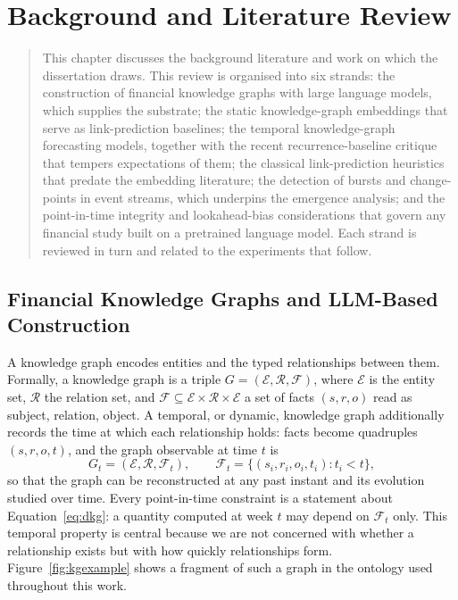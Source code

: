 \documentclass[a4paper,12pt]{report}
\newenvironment{microabstract}{\begin{quotation}\noindent}{\end{quotation}}
\begin{document}
\chapter{Background and Literature Review}
\label{ch:background}
\begin{microabstract}
This chapter discusses the background literature and work on which the dissertation draws. This review is
organised into six strands: the construction of financial knowledge graphs
with large language models, which supplies the substrate; the static
knowledge-graph embeddings that serve as link-prediction baselines; the temporal
knowledge-graph forecasting models, together with the recent recurrence-baseline
critique that tempers expectations of them; the classical link-prediction
heuristics that predate the embedding literature; the detection of bursts and
change-points in event streams, which underpins the emergence analysis; and the
point-in-time integrity and lookahead-bias considerations that govern any
financial study built on a pretrained language model. Each strand is reviewed in
turn and related to the experiments that follow.
\end{microabstract}

\section{Financial Knowledge Graphs and LLM-Based Construction}
A knowledge graph encodes entities and the typed relationships between them.
Formally, a knowledge graph is a triple $G = (\mathcal{E}, \mathcal{R},
\mathcal{F})$, where $\mathcal{E}$ is the entity set, $\mathcal{R}$ the
relation set, and $\mathcal{F} \subseteq \mathcal{E} \times \mathcal{R}
\times \mathcal{E}$ a set of facts $(s, r, o)$ read as subject, relation,
object. A temporal, or dynamic, knowledge graph additionally records the
time at which each relationship holds: facts become quadruples
$(s, r, o, t)$, and the graph observable at time $t$ is
\begin{equation}
G_t = (\mathcal{E}, \mathcal{R}, \mathcal{F}_t), \qquad
\mathcal{F}_t = \{ (s_i, r_i, o_i, t_i) : t_i < t \},
\label{eq:dkg}
\end{equation}
so that the graph can be reconstructed at any past instant and its
evolution studied over time. Every point-in-time constraint is a statement about Equation~\ref{eq:dkg}: a quantity
computed at week $t$ may depend on $\mathcal{F}_t$ only. This temporal
property is central because we are not concerned with whether a relationship
exists but with how quickly relationships form. Figure~\ref{fig:kgexample} shows a
fragment of such a graph in the ontology used throughout this work.
\end{document}

